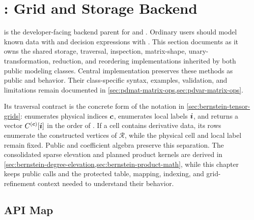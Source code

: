 \chapter{\texorpdfstring{}{pdbase}: Grid and Storage Backend}
\label{sec:pdbase}

 is the developer-facing backend parent for  and . Ordinary users should model known data with  and decision expressions with . This section documents  as it owns the shared storage, traversal, inspection, matrix-shape, unary-transformation, reduction, and reordering implementations inherited by both public modeling classes. Central implementation preserves these methods as public  and  behavior. Their class-specific syntax, examples, validation, and limitations remain documented in \cref{sec:pdmat-matrix-ops,sec:pdvar-matrix-ops}.

Its traversal contract is the concrete form of the notation in \cref{sec:bernstein-tensor-grids}:  enumerates physical indices $\boldsymbol{c}$,  enumerates local labels $\boldsymbol{i}$, and  returns a vector $C^{(\boldsymbol{c})}[\boldsymbol{i}]$ in the order of . If a cell contains derivative data, its rows enumerate the constructed vertices of $\mathcal R$, while the physical cell and local label remain fixed. Public  and coefficient algebra preserve this separation. The consolidated sparse elevation and planned product kernels are derived in \cref{sec:bernstein-degree-elevation,sec:bernstein-product-math}, while this chapter keeps public calls and the protected table, mapping, indexing, and grid-refinement context needed to understand their behavior.

\section{API Map}
\label{sec:pdbase-lookup}


